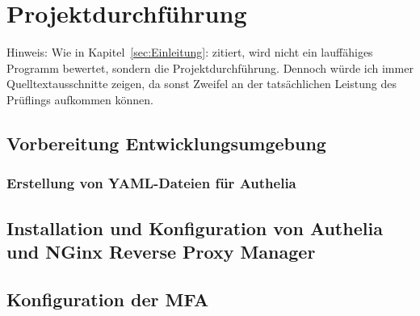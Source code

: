 \section{Projektdurchführung} 
\label{sec:Projektdurchführung}

Hinweis: Wie in Kapitel~\ref{sec:Einleitung}:  zitiert, 
wird nicht ein lauffähiges Programm bewertet, sondern die Projektdurchführung. 
Dennoch würde ich immer Quelltextausschnitte zeigen, da sonst Zweifel an der 
tatsächlichen Leistung des Prüflings aufkommen können.

\subsection{Vorbereitung Entwicklungsumgebung}
\label{Vorbereitung der Entwicklungsumgebung}

\subsubsection{Erstellung von YAML-Dateien für Authelia}
\label{Erstellung von YAML-Dateien für Authelia}

\subsection{Installation und Konfiguration von Authelia und NGinx Reverse Proxy Manager}
\label{Installation und Konfiguration von Authelia und NGinx Reverse Proxy Manager}

\subsection{Konfiguration der MFA}
\label{Konfiguration der MFA}